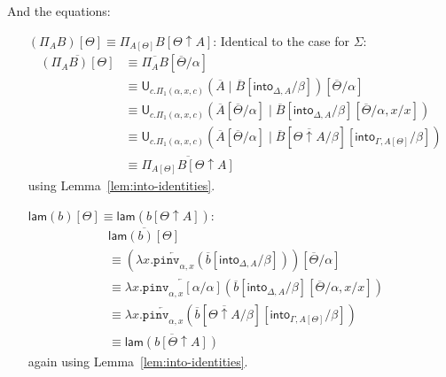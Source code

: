 \documentclass[10pt]{article}
\theoremstyle{definition}
\newcommand{\rewrite}[2]{\overleftarrow{#1}(#2)}
\newcommand\U[3]{\ensuremath{\mathsf{U}_{#1}(#2 \mid #3)}}
\newcommand\UI[2]{\ensuremath{\lambda #1.#2}}
\newcommand{\upstairs}[1]{\overline{#1}}
\newcommand\into[1]{\ensuremath{\mathsf{into}_{#1}}}
\newcommand\pinv[1]{\ensuremath{\mathtt{pinv}_{#1}}}
\newcommand\qlam{\ensuremath{\mathsf{lam}}}
\begin{document}
And the equations:
\begin{enumerate}[style = multiline, labelwidth = 80pt]
\item[{$(\Pi_A B)[\Theta] \equiv \Pi_{A[\Theta]} B[\Theta \uparrow A]$}:] Identical to the case for $\Sigma$:
\begin{align*}
\upstairs{(\Pi_A B)[\Theta]}
&\equiv \upstairs{\Pi_A B}[\upstairs{\Theta}/\alpha] \\
&\equiv \U{c.\Pi_1(\alpha,x,c)}{\upstairs{A}}{\upstairs{B}[\into{\Delta, A}/\beta]}[\upstairs{\Theta}/\alpha] \\
&\equiv \U{c.\Pi_1(\alpha,x,c)}{\upstairs{A}[\upstairs{\Theta}/\alpha]}{\upstairs{B}[\into{\Delta, A}/\beta][\upstairs{\Theta}/\alpha,x/x]} \\
&\equiv \U{c.\Pi_1(\alpha,x,c)}{\upstairs{A}[\upstairs{\Theta}/\alpha]}{\upstairs{B}[\upstairs{\Theta \uparrow A}/\beta][\into{\Gamma, A[\Theta]}/\beta]} \\
&\equiv \upstairs{\Pi_{A[\Theta]} B[\Theta \uparrow A]}
\end{align*}
using Lemma~\ref{lem:into-identities}.

\item[{$\qlam(b)[\Theta] \equiv \qlam(b[\Theta \uparrow A])$}:]
\begin{align*}
&\upstairs{\qlam(b)[\Theta]} \\
&\equiv (\UI{x}{\rewrite{\pinv{\alpha,x}}{\upstairs{b}[\into{\Delta, A}/\beta]}})[\upstairs{\Theta}/\alpha] \\
&\equiv \UI{x}{\rewrite{\pinv{\alpha,x}[\alpha/\alpha]}{\upstairs{b}[\into{\Delta, A}/\beta][\upstairs{\Theta}/\alpha, x / x]}} \\
&\equiv \UI{x}{\rewrite{\pinv{\alpha,x}}{\upstairs{b}[\upstairs{\Theta \uparrow A}/\beta][\into{\Gamma, A[\Theta]}/\beta]}} \\
&\equiv \upstairs{\qlam(b[\Theta \uparrow A])}
\end{align*}
again using Lemma~\ref{lem:into-identities}.


\end{enumerate}
\end{document}

